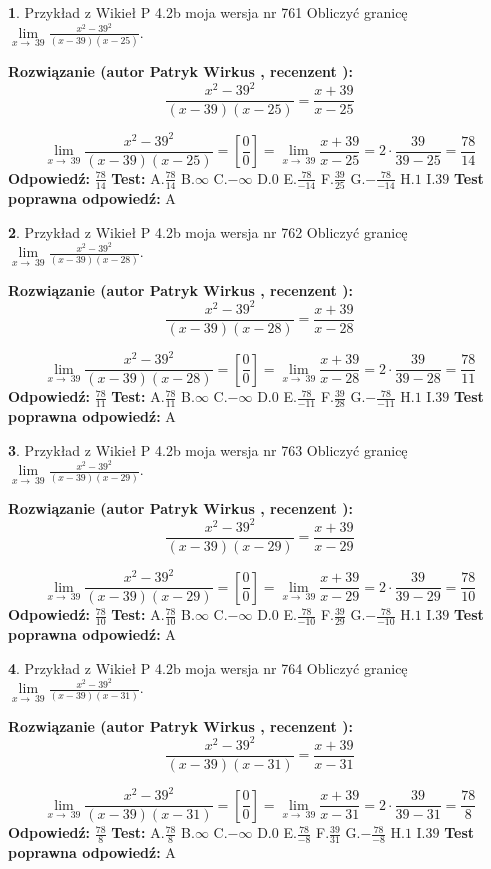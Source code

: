 \documentclass[12pt, a4paper]{article}
\theoremstyle{definition} %
\newtheorem{zad}{}
\newcommand{\zadStart}[1]{\begin{zad}#1\newline}
\newcommand{\zadStop}{\end{zad}}
\newcommand{\rozwStart}[2]{\noindent \textbf{Rozwiązanie (autor #1 , recenzent #2): }\newline}
\newcommand{\rozwStop}{\newline}
\newcommand{\odpStart}{\noindent \textbf{Odpowiedź:}\newline}
\newcommand{\odpStop}{\newline}
\newcommand{\testStart}{\noindent \textbf{Test:}\newline}
\newcommand{\testStop}{\newline}
\newcommand{\kluczStart}{\noindent \textbf{Test poprawna odpowiedź:}\newline}
\newcommand{\kluczStop}{\newline}
\begin{document}
\zadStart{Przykład z Wikieł P 4.2b moja wersja nr 761}
Obliczyć granicę $\lim\limits_{x\to\ 39}\frac{x^{2}-39^{2}}{(x-39)(x-25)}$.
\zadStop
\rozwStart{Patryk Wirkus}{}
$$\frac{x^{2}-39^{2}}{(x-39)(x-25)}=\frac{x+39}{x-25}$$

$$\lim\limits_{x\to\ 39}\frac{x^{2}-39^{2}}{(x-39)(x-25)}=[\frac{0}{0}]=\lim\limits_{x\to\ 39}\frac{x+39}{x-25}=2 \cdot \frac{39}{39-25} = \frac{78}{14}$$
\rozwStop
\odpStart
$\frac{78}{14}$
\odpStop
\testStart
A.$\frac{78}{14}$
B.$\infty$
C.$-\infty$
D.$0$
E.$\frac{78}{-14}$
F.$\frac{39}{25}$
G.$-\frac{78}{-14}$
H.$1$
I.$39$
\testStop
\kluczStart
A
\kluczStop



\zadStart{Przykład z Wikieł P 4.2b moja wersja nr 762}
Obliczyć granicę $\lim\limits_{x\to\ 39}\frac{x^{2}-39^{2}}{(x-39)(x-28)}$.
\zadStop
\rozwStart{Patryk Wirkus}{}
$$\frac{x^{2}-39^{2}}{(x-39)(x-28)}=\frac{x+39}{x-28}$$

$$\lim\limits_{x\to\ 39}\frac{x^{2}-39^{2}}{(x-39)(x-28)}=[\frac{0}{0}]=\lim\limits_{x\to\ 39}\frac{x+39}{x-28}=2 \cdot \frac{39}{39-28} = \frac{78}{11}$$
\rozwStop
\odpStart
$\frac{78}{11}$
\odpStop
\testStart
A.$\frac{78}{11}$
B.$\infty$
C.$-\infty$
D.$0$
E.$\frac{78}{-11}$
F.$\frac{39}{28}$
G.$-\frac{78}{-11}$
H.$1$
I.$39$
\testStop
\kluczStart
A
\kluczStop



\zadStart{Przykład z Wikieł P 4.2b moja wersja nr 763}
Obliczyć granicę $\lim\limits_{x\to\ 39}\frac{x^{2}-39^{2}}{(x-39)(x-29)}$.
\zadStop
\rozwStart{Patryk Wirkus}{}
$$\frac{x^{2}-39^{2}}{(x-39)(x-29)}=\frac{x+39}{x-29}$$

$$\lim\limits_{x\to\ 39}\frac{x^{2}-39^{2}}{(x-39)(x-29)}=[\frac{0}{0}]=\lim\limits_{x\to\ 39}\frac{x+39}{x-29}=2 \cdot \frac{39}{39-29} = \frac{78}{10}$$
\rozwStop
\odpStart
$\frac{78}{10}$
\odpStop
\testStart
A.$\frac{78}{10}$
B.$\infty$
C.$-\infty$
D.$0$
E.$\frac{78}{-10}$
F.$\frac{39}{29}$
G.$-\frac{78}{-10}$
H.$1$
I.$39$
\testStop
\kluczStart
A
\kluczStop



\zadStart{Przykład z Wikieł P 4.2b moja wersja nr 764}
Obliczyć granicę $\lim\limits_{x\to\ 39}\frac{x^{2}-39^{2}}{(x-39)(x-31)}$.
\zadStop
\rozwStart{Patryk Wirkus}{}
$$\frac{x^{2}-39^{2}}{(x-39)(x-31)}=\frac{x+39}{x-31}$$

$$\lim\limits_{x\to\ 39}\frac{x^{2}-39^{2}}{(x-39)(x-31)}=[\frac{0}{0}]=\lim\limits_{x\to\ 39}\frac{x+39}{x-31}=2 \cdot \frac{39}{39-31} = \frac{78}{8}$$
\rozwStop
\odpStart
$\frac{78}{8}$
\odpStop
\testStart
A.$\frac{78}{8}$
B.$\infty$
C.$-\infty$
D.$0$
E.$\frac{78}{-8}$
F.$\frac{39}{31}$
G.$-\frac{78}{-8}$
H.$1$
I.$39$
\testStop
\kluczStart
A
\kluczStop
\end{document}
